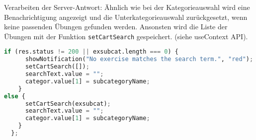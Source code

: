 Verarbeiten der Server-Antwort: Ähnlich wie bei der Kategorieauswahl wird eine Benachrichtigung angezeigt und die Unterkategorieauswahl zurückgesetzt, wenn keine passenden Übungen gefunden werden. Ansonsten wird die Liste der Übungen mit der Funktion \texttt{setCartSearch} gespeichert. (siehe useContext API).


\begin{lstlisting}[language=Python]
if (res.status != 200 || exsubcat.length === 0) {
      showNotification("No exercise matches the search term.", "red");
      setCartSearch([]);
      searchText.value = "";
      categor.value[1] = subcategoryName;
    }
else {
      setCartSearch(exsubcat);
      searchText.value = "";
      categor.value[1] = subcategoryName;
    }
  };
\end{lstlisting}
